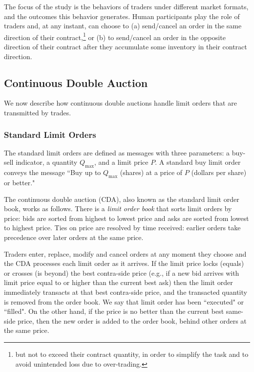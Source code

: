 The focus of the study is the behaviors of traders under different market formats, and the outcomes this behavior generates. Human participants play the role of traders and, at any instant, can choose to (a) send/cancel an order in the same direction of their contract,\footnote{ 
but not to exceed their contract quantity, in order to simplify the task and to avoid unintended loss due to over-trading.}
or (b) to send/cancel an order in the opposite direction of their contract after they accumulate some inventory in their contract direction. 

\subsection{Continuous Double Auction}

We now describe how continuous double auctions handle limit orders that are transmitted by trades. 

\subsubsection{Standard Limit Orders}

The standard limit orders are defined as messages with three parameters: a buy-sell indicator, a quantity $Q_{\max}$, and a limit price $P$. A standard buy limit order conveys the message ``Buy up to $Q_{\max}$ (shares) at a price of $P$ (dollars per share) or better." 

The continuous double auction (CDA), also known as the standard limit order book, works as follows. There is a \textit{limit order book} that sorts limit orders by price:  
bids are sorted from highest to lowest price and asks are sorted from lowest to highest price. 
Ties on price are resolved by time received: earlier orders take precedence over later orders at the same price. 

Traders enter, replace, modify and cancel orders at any moment they choose and the CDA processes each limit order as it arrives. If the limit price locks (equals) or crosses (is beyond) the best contra-side price (e.g., if a new bid arrives with limit price equal to or higher than the current best ask) then the limit order immediately transacts at that best contra-side price, and the transacted quantity is removed from the order book. We say that limit order has been ``executed" or ``filled". On the other hand, if the price is no better than the current best same-side price, then the new order is added to the order book, behind other orders at the same price. 


